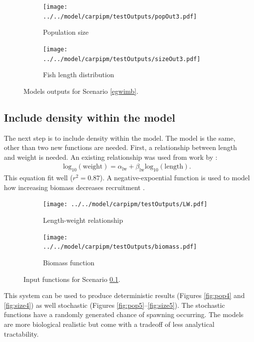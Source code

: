\documentclass{article}[12pt]
\begin{document}
\begin{figure}[htbp]
	\centering
	\begin{subfigure}[b]{0.45\textwidth}
		\texttt{[image: ../../model/carpipm/testOutputs/popOut3.pdf]} 
		\caption{Population size} 
		\label{fig:pop3}
	\end{subfigure}
	\qquad
	\begin{subfigure}[b]{0.45\textwidth}
		\texttt{[image: ../../model/carpipm/testOutputs/sizeOut3.pdf]} 
		\caption{Fish length distribution} 
		\label{fig:size3}
	\end{subfigure}
   \caption{Models outputs for Scenario \ref{egwimb}.}
   \label{fig:scn3out}
\end{figure}

\subsection{Include density within the model}\label{idwitm}


The next step is to include density within the model.
The model is the same, other than two new functions are needed.
First, a relationship between length and weight is needed.
An existing relationship was used from work by \citet{wanner2009length}:
\begin{eqnarray}
\text{log}_{10} (\text{weight}) = \alpha_{\text{lw}} + \beta_\text{lw}\text{log}_{10} (\text{length}).
\end{eqnarray}
This equation fit well (\(r^2 = 0.87\)).
A negative-expoential function is used to model how increasing biomass decreases recruitment \citep[Figure \ref{fig:biomass};][]{bolker2008ecological}.



\begin{figure}[htbp]
	\centering
	\begin{subfigure}[b]{0.45\textwidth}
		\texttt{[image: ../../model/carpipm/testOutputs/LW.pdf]} 
		\caption{Length-weight relationship} 
		\label{fig:lw}
	\end{subfigure}
	\qquad
	\begin{subfigure}[b]{0.45\textwidth}
		\texttt{[image: ../../model/carpipm/testOutputs/biomass.pdf]} 
		\caption{Biomass function} 
		\label{fig:biomass}
	\end{subfigure}
   \caption{Input functions for Scenario \ref{idwitm}.}
   \label{fig:scn4}
\end{figure}

This system can be used to produce deterministic results (Figures \ref{fig:pop4} and \ref{fig:size4}) as well stochastic (Figures \ref{fig:pop5}--\ref{fig:size5}).
The stochastic functions have a randomly generated chance of spawning occurring.
The models are more biological realistic but come with a tradeoff of less analytical tractability.
\end{document}
